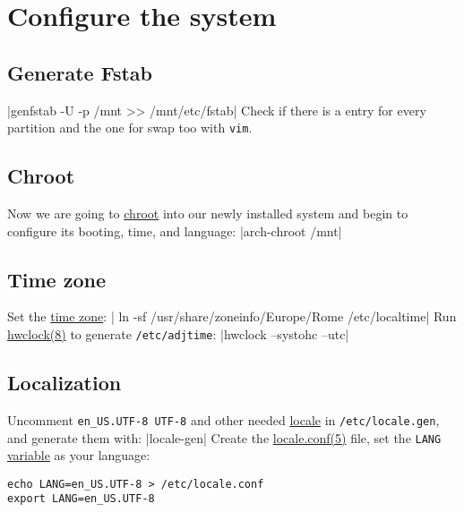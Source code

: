 \documentclass[11pt,A4]{article}
\newcommand{\linecode}[1]{ \mint[fontsize=\small,bgcolor=ArchCode,frame=single]{bash}|#1|}
\begin{document}
\vspace{-5mm}
\section{Configure the system}

\subsection{Generate Fstab}
\vspace{-3mm}
\linecode{genfstab -U -p /mnt >> /mnt/etc/fstab}
Check if there is a entry for every partition and the one for swap too with \texttt{vim}.
\subsection{Chroot}
Now we are going to \href{https://wiki.archlinux.org/index.php/Change_root}{chroot} into our newly installed system and begin to configure its booting, time, and language:
\linecode{arch-chroot /mnt}

\vspace{-7mm}
\subsection{Time zone}
Set the \href{https://wiki.archlinux.org/index.php/Time_zone}{time zone}:
\linecode{ ln -sf /usr/share/zoneinfo/Europe/Rome /etc/localtime}
Run \href{https://jlk.fjfi.cvut.cz/arch/manpages/man/hwclock.8}{hwclock(8)} to generate \texttt{/etc/adjtime}:
\linecode{hwclock --systohc --utc}

\vspace{-7mm}
\subsection{Localization}
Uncomment \texttt{en\_US.UTF-8 UTF-8} and other needed \href{https://wiki.archlinux.org/index.php/Locale}{locale} in \texttt{/etc/locale.gen}, and generate them with:
\linecode{locale-gen}
Create the \href{https://jlk.fjfi.cvut.cz/arch/manpages/man/locale.conf.5}{locale.conf(5)} file, set the \texttt{LANG} \href{https://wiki.archlinux.org/index.php/Variable}{variable} as your language:
\begin{verbatim}
echo LANG=en_US.UTF-8 > /etc/locale.conf
export LANG=en_US.UTF-8
\end{verbatim}

\vspace{-2mm}
\end{document}
